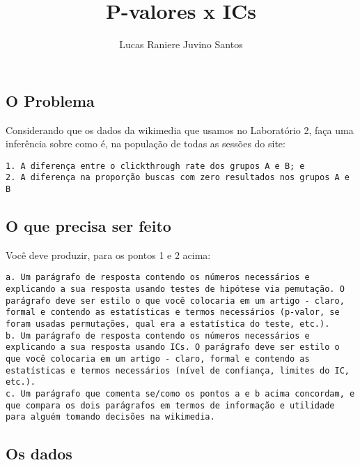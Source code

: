 \documentclass[]{article}
\title{P-valores x ICs}
\author{Lucas Raniere Juvino Santos}
\date{}
\begin{document}
\maketitle

{
\setcounter{tocdepth}{2}
\tableofcontents
}
\hypertarget{o-problema}{%
\subsection{O Problema}\label{o-problema}}

Considerando que os dados da wikimedia que usamos no Laboratório 2, faça
uma inferência sobre como é, na população de todas as sessões do site:

\begin{verbatim}
1. A diferença entre o clickthrough rate dos grupos A e B; e
2. A diferença na proporção buscas com zero resultados nos grupos A e B
\end{verbatim}

\hypertarget{o-que-precisa-ser-feito}{%
\subsection{O que precisa ser feito}\label{o-que-precisa-ser-feito}}

Você deve produzir, para os pontos 1 e 2 acima:

\begin{verbatim}
a. Um parágrafo de resposta contendo os números necessários e explicando a sua resposta usando testes de hipótese via pemutação. O parágrafo deve ser estilo o que você colocaria em um artigo - claro, formal e contendo as estatísticas e termos necessários (p-valor, se foram usadas permutações, qual era a estatística do teste, etc.).
b. Um parágrafo de resposta contendo os números necessários e explicando a sua resposta usando ICs. O parágrafo deve ser estilo o que você colocaria em um artigo - claro, formal e contendo as estatísticas e termos necessários (nível de confiança, limites do IC, etc.).
c. Um parágrafo que comenta se/como os pontos a e b acima concordam, e que compara os dois parágrafos em termos de informação e utilidade para alguém tomando decisões na wikimedia.
\end{verbatim}

\hypertarget{os-dados}{%
\subsection{Os dados}\label{os-dados}}
\end{document}

